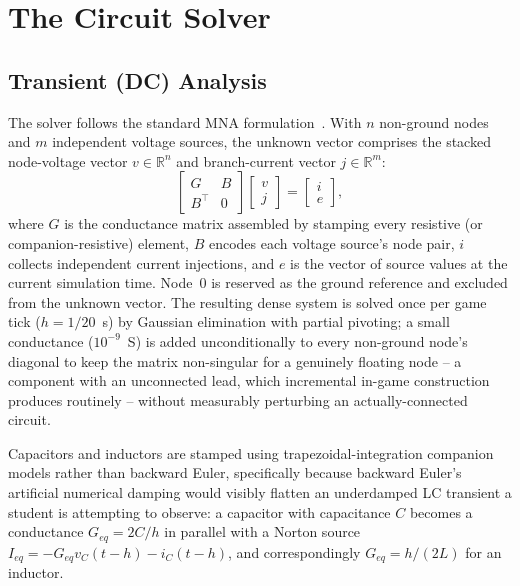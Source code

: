 \section{The Circuit Solver}

\subsection{Transient (DC) Analysis}
\label{sec:circuit-solver}

The solver follows the standard MNA formulation~\cite{ho1975mna}. With $n$ non-ground nodes
and $m$ independent voltage sources, the unknown vector comprises the stacked node-voltage
vector $v \in \mathbb{R}^n$ and branch-current vector $j \in \mathbb{R}^m$:
\begin{equation}
\begin{bmatrix} G & B \\ B^{\top} & 0 \end{bmatrix}
\begin{bmatrix} v \\ j \end{bmatrix}
=
\begin{bmatrix} i \\ e \end{bmatrix},
\end{equation}
where $G$ is the conductance matrix assembled by stamping every resistive (or
companion-resistive) element, $B$ encodes each voltage source's node pair, $i$ collects
independent current injections, and $e$ is the vector of source values at the current
simulation time. Node~0 is reserved as the ground reference and excluded from the unknown
vector. The resulting dense system is solved once per game tick ($h=1/20$~s) by Gaussian
elimination with partial pivoting; a small conductance ($10^{-9}$~S) is added unconditionally
to every non-ground node's diagonal to keep the matrix non-singular for a genuinely floating
node -- a component with an unconnected lead, which incremental in-game construction produces
routinely -- without measurably perturbing an actually-connected circuit.

Capacitors and inductors are stamped using trapezoidal-integration companion models rather
than backward Euler, specifically because backward Euler's artificial numerical damping would
visibly flatten an underdamped LC transient a student is attempting to observe: a capacitor
with capacitance $C$ becomes a conductance $G_{eq}=2C/h$ in parallel with a Norton source
$I_{eq}=-G_{eq}v_C(t-h)-i_C(t-h)$, and correspondingly $G_{eq}=h/(2L)$ for an inductor.

